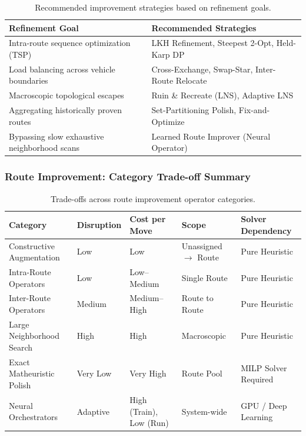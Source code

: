 \documentclass{article}
\begin{document}
\begin{table}[H]
    \centering
    \caption{Recommended improvement strategies based on refinement goals.}
    \begin{tabularx}{\textwidth}{@{} l X @{}}
        \toprule
        \textbf{Refinement Goal} & \textbf{Recommended Strategies} \\
        \midrule
        Intra-route sequence optimization (TSP) & LKH Refinement, Steepest 2-Opt, Held-Karp DP \\
        Load balancing across vehicle boundaries & Cross-Exchange, Swap-Star, Inter-Route Relocate \\
        Macroscopic topological escapes & Ruin \& Recreate (LNS), Adaptive LNS \\
        Aggregating historically proven routes & Set-Partitioning Polish, Fix-and-Optimize \\
        Bypassing slow exhaustive neighborhood scans & Learned Route Improver (Neural Operator) \\
        \bottomrule
    \end{tabularx}
\end{table}

\subsubsection*{Route Improvement: Category Trade-off Summary}

\begin{table}[H]
    \centering
    \caption{Trade-offs across route improvement operator categories.}
    \begin{tabularx}{\textwidth}{@{} X l l l X @{}}
        \toprule
        \textbf{Category} & \textbf{Disruption} & \textbf{Cost per Move} & \textbf{Scope} & \textbf{Solver Dependency} \\
        \midrule
        Constructive Augmentation & Low & Low & Unassigned $\to$ Route & Pure Heuristic \\
        Intra-Route Operators & Low & Low--Medium & Single Route & Pure Heuristic \\
        Inter-Route Operators & Medium & Medium--High & Route to Route & Pure Heuristic \\
        Large Neighborhood Search & High & High & Macroscopic & Pure Heuristic \\
        Exact Matheuristic Polish & Very Low & Very High & Route Pool & MILP Solver Required \\
        Neural Orchestrators & Adaptive & High (Train), Low (Run) & System-wide & GPU / Deep Learning \\
        \bottomrule
    \end{tabularx}
\end{table}
\end{document}
